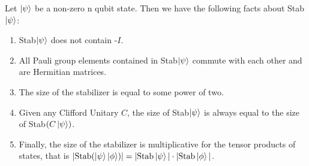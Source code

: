 \documentclass[12pt]{dalthesis}
\begin{document}
\begin{proposition}
Let $\ket{\psi}$ be a non-zero n qubit state. Then we have the following facts about Stab$\ket{\psi}$:
\begin{enumerate}
\item Stab$\ket{\psi}$ does not contain -$I$.
\item All Pauli group elements contained in Stab$\ket{\psi}$ commute with each other and are Hermitian matrices.
\item The size of the stabilizer is equal to some power of two.
\item Given any Clifford Unitary $C$, the size of Stab$\ket{\psi}$ is always equal to the size of Stab$(C \ket{\psi})$.
\item Finally, the size of the stabilizer is multiplicative for the tensor products of states, that is $| \text{Stab} (\ket{\psi} \ket{\phi})| = |\text{Stab}\ket{\psi}| \cdot |\text{Stab}\ket{\phi}|$. 
\end{enumerate}
\end{proposition}
\end{document}
